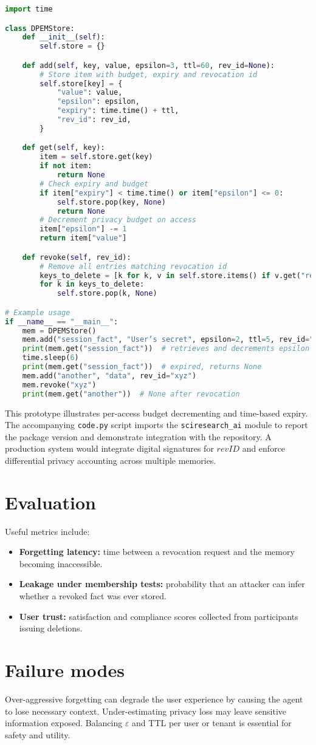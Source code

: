 \documentclass{article}
\begin{document}
\begin{lstlisting}[language=Python, caption={Prototype of a DPEM
store.}, label={lst:dpem}]
import time

class DPEMStore:
    def __init__(self):
        self.store = {}

    def add(self, key, value, epsilon=3, ttl=60, rev_id=None):
        # Store item with budget, expiry and revocation id
        self.store[key] = {
            "value": value,
            "epsilon": epsilon,
            "expiry": time.time() + ttl,
            "rev_id": rev_id,
        }

    def get(self, key):
        item = self.store.get(key)
        if not item:
            return None
        # Check expiry and budget
        if item["expiry"] < time.time() or item["epsilon"] <= 0:
            self.store.pop(key, None)
            return None
        # Decrement privacy budget on access
        item["epsilon"] -= 1
        return item["value"]

    def revoke(self, rev_id):
        # Remove all entries matching revocation id
        keys_to_delete = [k for k, v in self.store.items() if v.get("rev_id") == rev_id]
        for k in keys_to_delete:
            self.store.pop(k, None)

# Example usage
if __name__ == "__main__":
    mem = DPEMStore()
    mem.add("session_fact", "User’s secret", epsilon=2, ttl=5, rev_id="abc123")
    print(mem.get("session_fact"))  # retrieves and decrements epsilon
    time.sleep(6)
    print(mem.get("session_fact"))  # expired, returns None
    mem.add("another", "data", rev_id="xyz")
    mem.revoke("xyz")
    print(mem.get("another"))  # None after revocation
\end{lstlisting}

This prototype illustrates per-access budget decrementing and time-based
expiry. The accompanying \texttt{code.py} script imports the
\texttt{sciresearch\_ai} module to report the package version and
demonstrate integration with the repository. A production system
would integrate digital signatures for $\mathit{revID}$ and enforce
differential privacy accounting across multiple memories.

\section{Evaluation}
Useful metrics include:
\begin{itemize}
  \item \textbf{Forgetting latency:} time between a revocation request
        and the memory becoming inaccessible.
  \item \textbf{Leakage under membership tests:} probability that an
        attacker can infer whether a revoked fact was ever stored.
  \item \textbf{User trust:} satisfaction and compliance scores
        collected from participants issuing deletions.
\end{itemize}

\section{Failure modes}
Over-aggressive forgetting can degrade the user experience by causing
the agent to lose necessary context.  Under-estimating privacy loss
may leave sensitive information exposed.  Balancing
$\varepsilon$ and TTL per user or tenant is essential for safety and
utility.
\end{document}
